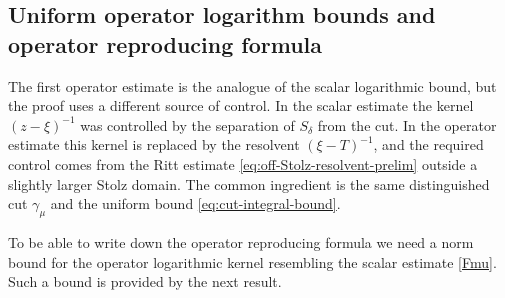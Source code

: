 \documentclass[11pt]{amsart}
\numberwithin{equation}{section}
\theoremstyle{definition}
\theoremstyle{plain}
\begin{document}
\subsection{Uniform operator logarithm bounds and operator reproducing formula}

The first operator estimate is the analogue of the scalar logarithmic bound,
but the proof uses a different source of control.  In the scalar estimate the
kernel \((z-\xi)^{-1}\) was controlled by the separation of \(S_\delta\) from
the cut.  In the operator estimate this kernel is replaced by the resolvent
\((\xi-T)^{-1}\), and the required control comes from the Ritt estimate \eqref{eq:off-Stolz-resolvent-prelim}
 outside a slightly larger Stolz domain.
The common ingredient is the same distinguished cut $\gamma_\mu$ and 
the uniform bound \eqref{eq:cut-integral-bound}.

To be able to write down the operator reproducing formula we need
a norm bound for the operator logarithmic kernel resembling the scalar estimate \eqref{Fmu}.
Such a bound is provided by the next result.
\end{document}
